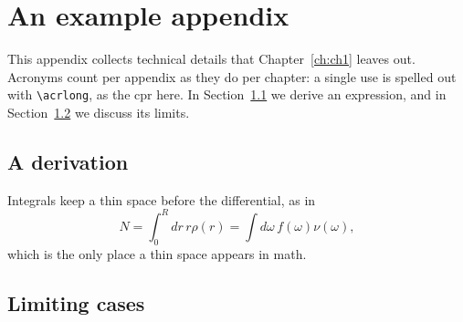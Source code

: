 \documentclass[../main]{subfiles}
\begin{document}
\ifSubfilesClassLoaded{\appendix}{}
\chapter{An example appendix}
\label{app:example}

This appendix collects technical details that Chapter~\ref{ch:ch1} leaves out.
Acronyms count per appendix as they do per chapter: a single use is spelled out with \verb|\acrlong|, as the \acrlong{cpr} here.
\lipsum[1][1-4]
In Section~\ref{app:derivation} we derive an expression, and in Section~\ref{app:limits} we discuss its limits.

\section{A derivation}
\label{app:derivation}
\lipsum[2][1-4]
Integrals keep a thin space before the differential, as in
\begin{equation}
    \label{eq:app_integral}
    N = \int_0^R dr\,r\rho(r) = \int d\omega\, f(\omega)\nu(\omega),
\end{equation}
which is the only place a thin space appears in math.
\lipsum[3][1-5]

\section{Limiting cases}
\label{app:limits}
\lipsum[4][1-6]

\lipsum[5][1-6]

\ifSubfilesClassLoaded{%
\newrefcontext[labelprefix=]
\printbibliography
}{}
\end{document}
